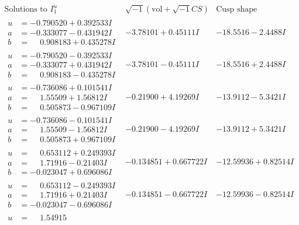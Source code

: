 \documentclass[1p]{elsarticle_modified}
\theoremstyle{definition}
\newcommand{\I}{\sqrt{-1}}
\begin{document}
$$\begin{array}{c|c|c}  
\text{Solutions to }I^u_{1}& \I (\text{vol} + \sqrt{-1}CS) & \text{Cusp shape}\\
 \hline 
\begin{aligned}
u &= -0.790520 + 0.392533 I \\
a &= -0.333077 - 0.431942 I \\
b &= \phantom{-}0.908183 + 0.435278 I\end{aligned}
 & -3.78101 + 0.45111 I & -18.5516 - 2.4488 I \\ \hline\begin{aligned}
u &= -0.790520 - 0.392533 I \\
a &= -0.333077 + 0.431942 I \\
b &= \phantom{-}0.908183 - 0.435278 I\end{aligned}
 & -3.78101 - 0.45111 I & -18.5516 + 2.4488 I \\ \hline\begin{aligned}
u &= -0.736086 + 0.101541 I \\
a &= \phantom{-}1.55509 + 1.56812 I \\
b &= \phantom{-}0.505873 - 0.967109 I\end{aligned}
 & -0.21900 + 4.19269 I & -13.9112 - 5.3421 I \\ \hline\begin{aligned}
u &= -0.736086 - 0.101541 I \\
a &= \phantom{-}1.55509 - 1.56812 I \\
b &= \phantom{-}0.505873 + 0.967109 I\end{aligned}
 & -0.21900 - 4.19269 I & -13.9112 + 5.3421 I \\ \hline\begin{aligned}
u &= \phantom{-}0.653112 + 0.249393 I \\
a &= \phantom{-}1.71916 - 0.21403 I \\
b &= -0.023047 + 0.696086 I\end{aligned}
 & -0.134851 + 0.667722 I & -12.59936 + 0.82514 I \\ \hline\begin{aligned}
u &= \phantom{-}0.653112 - 0.249393 I \\
a &= \phantom{-}1.71916 + 0.21403 I \\
b &= -0.023047 - 0.696086 I\end{aligned}
 & -0.134851 - 0.667722 I & -12.59936 - 0.82514 I \\ \hline\begin{aligned}
u &= \phantom{-}1.54915\phantom{ +0.000000I} \\

\end{aligned}
\end{array}$$
\end{document}
